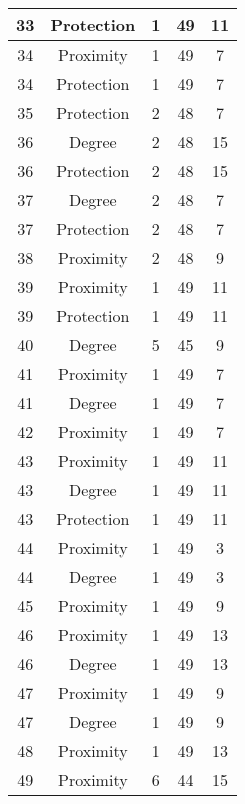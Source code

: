 \documentclass[results.tex]{subfiles}
\begin{document}
\begin{center}
\begin{tabular}{| c || c | c | c | c |}
    \hline
    33 & Protection & 1 & 49 & 11 \\ 
    \hline
    34 & Proximity & 1 & 49 & 7 \\ 
    \hline
    34 & Protection & 1 & 49 & 7 \\ 
    \hline
    35 & Protection & 2 & 48 & 7 \\ 
    \hline
    36 & Degree & 2 & 48 & 15 \\ 
    \hline
    36 & Protection & 2 & 48 & 15 \\ 
    \hline
    37 & Degree & 2 & 48 & 7 \\ 
    \hline
    37 & Protection & 2 & 48 & 7 \\ 
    \hline
    38 & Proximity & 2 & 48 & 9 \\ 
    \hline
    39 & Proximity & 1 & 49 & 11 \\ 
    \hline
    39 & Protection & 1 & 49 & 11 \\ 
    \hline
    40 & Degree & 5 & 45 & 9 \\ 
    \hline
    41 & Proximity & 1 & 49 & 7 \\ 
    \hline
    41 & Degree & 1 & 49 & 7 \\ 
    \hline
    42 & Proximity & 1 & 49 & 7 \\ 
    \hline
    43 & Proximity & 1 & 49 & 11 \\ 
    \hline
    43 & Degree & 1 & 49 & 11 \\ 
    \hline
    43 & Protection & 1 & 49 & 11 \\ 
    \hline
    44 & Proximity & 1 & 49 & 3 \\ 
    \hline
    44 & Degree & 1 & 49 & 3 \\ 
    \hline
    45 & Proximity & 1 & 49 & 9 \\ 
    \hline
    46 & Proximity & 1 & 49 & 13 \\ 
    \hline
    46 & Degree & 1 & 49 & 13 \\ 
    \hline
    47 & Proximity & 1 & 49 & 9 \\ 
    \hline
    47 & Degree & 1 & 49 & 9 \\ 
    \hline
    48 & Proximity & 1 & 49 & 13 \\ 
    \hline
    49 & Proximity & 6 & 44 & 15 \\ 
    \hline   \end{tabular}
\end{center}
\end{document}
